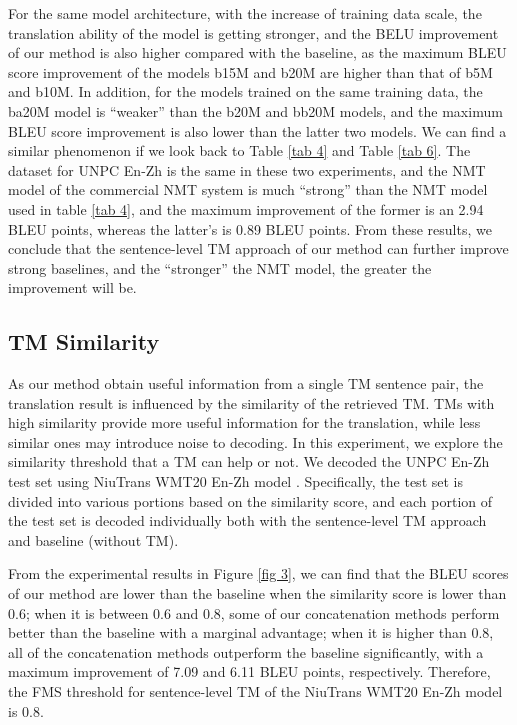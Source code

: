 \documentclass[letterpaper]{article} %
\begin{document}
For the same model architecture, with the increase of training data scale, the translation ability of the model is getting stronger, and the BELU improvement of our method is also higher compared with the baseline, as the maximum BLEU score improvement of the models b15M and b20M are higher than that of b5M and b10M. In addition, for the models trained on the same training data, the ba20M model is ``weaker'' than the b20M and bb20M models, and the maximum BLEU score improvement is also lower than the latter two models. We can find a similar phenomenon if we look back to Table \ref{tab 4} and Table \ref{tab 6}. The dataset for UNPC En-Zh is the same in these two experiments, and the NMT model of the commercial NMT system is much ``strong'' than the NMT model used in table \ref{tab 4}, and the maximum improvement of the former is an 2.94 BLEU points, whereas the latter's is 0.89 BLEU points. From these results, we conclude that the sentence-level TM approach of our method can further improve strong baselines, and the ``stronger'' the NMT model, the greater the improvement will be.

\subsection{TM Similarity}

As our method obtain useful information from a single TM sentence pair, the translation result is influenced by the similarity of the retrieved TM. TMs with high similarity provide more useful information for the translation, while less similar ones may introduce noise to decoding. In this experiment, we explore the similarity threshold that a TM can help or not. We decoded the UNPC En-Zh test set using NiuTrans WMT20 En-Zh model \cite{Yuhao2020TheNiuTrans}. Specifically, the test set is divided into various portions based on the similarity score, and each portion of the test set is decoded individually both with the sentence-level TM approach and baseline (without TM). 

From the experimental results in Figure \ref{fig 3}, we can find that the BLEU scores of our method are lower than the baseline when the similarity score is lower than 0.6; when it is between 0.6 and 0.8, some of our concatenation methods perform better than the baseline with a marginal advantage; when it is higher than 0.8, all of the concatenation methods outperform the baseline significantly, with a maximum improvement of 7.09 and 6.11 BLEU points, respectively. Therefore, the FMS threshold for sentence-level TM of the NiuTrans WMT20 En-Zh model is 0.8. 
\end{document}
